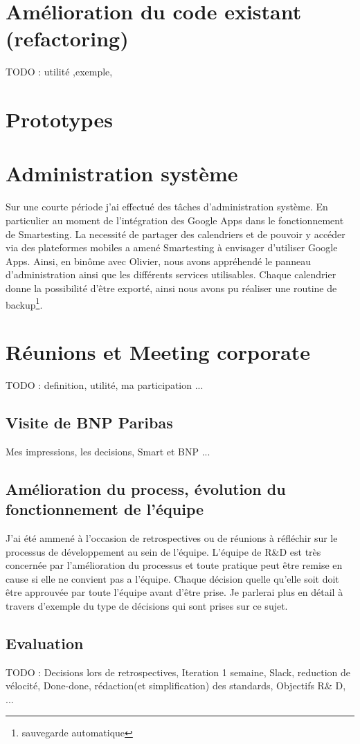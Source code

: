 \section{Amélioration du code existant (refactoring)}
TODO : utilité ,exemple, 

\section{Prototypes}

\section{Administration système}
Sur une courte période j'ai effectué des t\^aches d'administration système. En particulier au moment de l'intégration des Google Apps dans le fonctionnement de Smartesting. La necessité de partager des calendriers et de pouvoir y accéder via des plateformes mobiles a amené Smartesting à envisager d'utiliser Google Apps. Ainsi, en binôme avec Olivier, nous avons appréhendé le panneau d'administration ainsi que les différents services utilisables. Chaque calendrier donne la possibilité d'être exporté, ainsi nous avons pu réaliser une routine de backup\footnote{sauvegarde automatique}.

\section{Réunions et Meeting corporate}

TODO : definition, utilité, ma participation ...

\subsection{Visite de BNP Paribas}
Mes impressions, les decisions, Smart et BNP ...

\subsection{Amélioration du process, évolution du fonctionnement de l'équipe}
J'ai été ammené à l'occasion de retrospectives ou de réunions à réfléchir sur le processus de développement au sein de l'équipe. L'équipe de R\&D est très concernée par l'amélioration du processus et toute pratique peut être remise en cause si elle ne convient pas a l'équipe. Chaque décision quelle qu'elle soit doit être approuvée par toute l'équipe avant d'être prise. Je parlerai plus en détail à travers d'exemple du type de décisions qui sont prises sur ce sujet.

\subsection{Evaluation}





TODO : Decisions lors de retrospectives, Iteration 1 semaine, Slack, reduction de vélocité, Done-done, rédaction(et simplification) des standards, Objectifs R\& D, ...